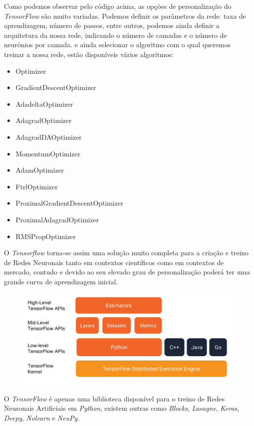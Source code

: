 Como podemos observar pelo código acima, as opções de personalização do \textit{TensorFlow} são muito variadas. Podemos definir os parâmetros da rede: taxa de aprendizagem, número de passos, entre outros, podemos ainda definir a arquitetura da nossa rede, indicando o número de camadas e o número de neurónios por camada. e ainda selecionar o algoritmo com o qual queremos treinar a nossa rede, estão disponíveis vários algoritmos:

\begin{itemize}
    \item Optimizer
    \item GradientDescentOptimizer
    \item AdadeltaOptimizer
    \item AdagradOptimizer
    \item AdagradDAOptimizer
    \item MomentumOptimizer
    \item AdamOptimizer
    \item FtrlOptimizer
    \item ProximalGradientDescentOptimizer
    \item ProximalAdagradOptimizer
    \item RMSPropOptimizer
\end{itemize}

O \textit{Tensorflow} torna-se assim uma solução muito completa para a criação e treino de Redes Neuronais tanto em contextos científicos como em contextos de mercado, contudo e devido ao seu elevado grau de personalização poderá ter uma grande curva de aprendizagem inicial.

\begin{figure}[H]
    \includegraphics[scale=0.18]{tex/img/tensorflow_programming_environment.png}
\end{figure}

\vspace{2mm} O \textit{TensorFlow} é apenas uma biblioteca disponível para o treino de Redes Neuronais Artificiais em \textit{Python}, existem outras como \textit{Blocks}, \textit{Lasagne}, \textit{Keras}, \textit{Deepy}, \textit{Nolearn} e \textit{NeuPy}.

